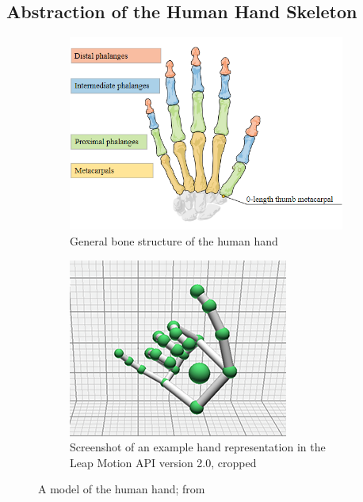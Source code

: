 \documentclass[hyperref, bachelorofscience]{cgvpub}
\begin{document}
\subsection{Abstraction of the Human Hand Skeleton}
\begin{figure}[b!]
	\begin{subfigure}{.5\linewidth}
		\includegraphics[width=\linewidth]{../pics/leap_anat}
		\caption{General bone structure of the human hand}
		\label{fig:hand_model:anat}
	\end{subfigure}
	\hfill
	\begin{subfigure}{.47\linewidth}
		\includegraphics[width=\linewidth]{../pics/leap_example}
		\caption{Screenshot of an example hand representation in the Leap Motion API version 2.0, cropped}
		\label{fig:hand_model:leap}
	\end{subfigure}
	\caption{A model of the human hand; from \cite{leaphand}}
	\label{fig:hand_model}
\end{figure}
\end{document}
